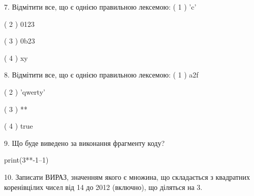 \documentclass[11pt]{article}
\begin{document}
7. %
Відмітити все, що є однією правильною лексемою:
( 1 ) 'c'

( 2 ) 0123

( 3 ) 0b23

( 4 ) xy
\vspace{5mm}

8. %
Відмітити все, що є однією правильною лексемою:
( 1 ) a2f

( 2 ) 'qwerty'

( 3 ) **

( 4 ) true
\vspace{5mm}

9. Що буде виведено за виконання фрагменту коду?

print(3**-1--1)
\vspace{5mm}

10. 
Записати ВИРАЗ, значенням якого є множина, що складається з квадратних коренівцілих чисел від 14 до 2012 (включно), що діляться на 3.\vspace{5mm}

\newpage
\end{document}
